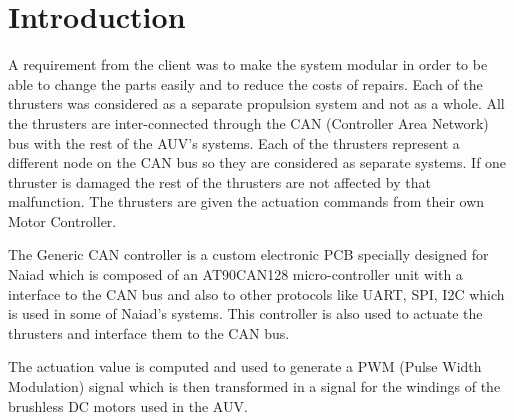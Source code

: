 \section{Introduction}\label{sec:introduction}
A requirement from the client was to make the system modular in order to be able to change the parts easily and to reduce the costs of repairs. Each of the thrusters was considered as a separate propulsion system and not as a whole. All the thrusters are inter-connected through the CAN (Controller Area Network) bus with the rest of the AUV's systems. Each of the thrusters represent a different node on the CAN bus so they are considered as separate systems. If one thruster is damaged the rest of the thrusters are not affected by that malfunction. The thrusters are given the actuation commands from their own Motor Controller. 

The Generic CAN controller is a custom electronic PCB specially designed for Naiad which is composed of an AT90CAN128 micro-controller unit with a interface to the CAN bus and also to other protocols like UART, SPI, I2C which is used in some of Naiad's systems. This controller is also used to actuate the thrusters and  interface them to the CAN bus.  

The actuation value is computed and used to generate a PWM (Pulse Width Modulation) signal which is then transformed in a signal for the windings of the brushless DC motors used in the AUV. 


